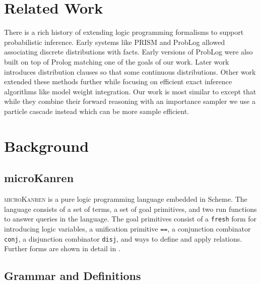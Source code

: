\documentclass[
]{ceurart}
\begin{document}
\section{Related Work}

There is a rich history of extending logic programming formalisms to
support probabilistic inference. Early systems like
PRISM\cite{sato1997prism} and ProbLog\cite{de2007problog} allowed
associating discrete distributions with facts. Early versions of
ProbLog were also built on top of Prolog matching one of the goals of
our work. Later work\cite{gutmann2010extending} introduces
distribution clauses so that some continuous distributions. Other work
extended these methods further while focusing on efficient exact
inference algorithms like model weight
integration\cite{islam2012inference, belle2015probabilistic}. Our work
is most similar to \cite{gutmann2011magic} except that while they
combine their forward reasoning with an importance sampler we use a
particle cascade instead which can be more sample efficient.

\section{Background}

\subsection{microKanren}

\textsc{microKanren}\cite{10.1145/2989225.2989230, daniel2018reasoned}
is a pure logic programming language embedded in Scheme. The language
consists of a set of terms, a set of goal primitives, and two run
functions to answer queries in the language. The goal primitives
consist of a \texttt{fresh} form for introducing logic variables, a
unification primitive \texttt{==}, a conjunction combinator
\texttt{conj}, a disjunction combinator \texttt{disj}, and ways to
define and apply relations. Further forms are shown in detail in
.

\subsection{Grammar and Definitions}
\end{document}
